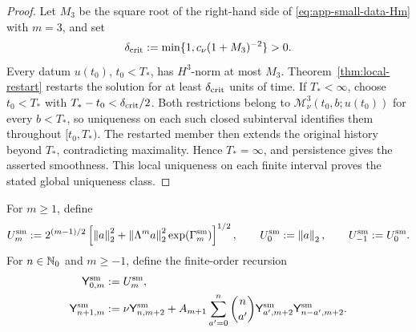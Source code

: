 \begin{proof}
Let \(M_3\) be the square root of the right-hand side of
\eqref{eq:app-small-data-Hm} with \(m=3\), and set
\[
 \delta_{\rm crit}
 :=\min\{1,c_\nu(1+M_3)^{-2}\}>0.
\]
Every datum \(u(t_0)\), \(t_0<T_*\), has \(H^3\)-norm at most \(M_3\).
Theorem~\ref{thm:local-restart} restarts the solution for at least
\(\delta_{\rm crit}\) units of time.  If \(T_*<\infty\), choose
\(t_0<T_*\) with \(T_*-t_0<\delta_{\rm crit}/2\).  Both restrictions belong
to \(\mathscr M_\nu^3(t_0,b;u(t_0))\) for every \(b<T_*\), so uniqueness on
each such closed subinterval identifies them throughout \([t_0,T_*)\).
The restarted member then extends the original history beyond \(T_*\),
contradicting maximality.  Hence \(T_*=\infty\), and persistence
 gives the asserted smoothness.  This local uniqueness on each finite
 interval proves the stated global uniqueness class.
\end{proof}

For \(m\ge1\), define
\[
 U_m^{\rm sm}
 :=
 2^{(m-1)/2}
 \left[
 \left\lVert a\right\rVert_2^2+
 \left\lVert \Lambda^ma\right\rVert_2^2\exp(\Gamma_m^{\rm sm})
 \right]^{1/2},
 \qquad
 U_0^{\rm sm}:=\left\lVert a\right\rVert_2,
 \qquad
 U_{-1}^{\rm sm}:=U_0^{\rm sm}.
\]
For \(n\in\mathbb N_0\) and \(m\ge-1\), define the finite-order recursion
\begin{align}
 \mathsf Y_{0,m}^{\rm sm}&:=U_m^{\rm sm},
 \label{eq:app-small-Y0}\\
 \mathsf Y_{n+1,m}^{\rm sm}
 &:=
 \nu\mathsf Y_{n,m+2}^{\rm sm}
 +A_{m+1}\sum_{a'=0}^{n}\binom n{a'}
 \mathsf Y_{a',m+2}^{\rm sm}
 \mathsf Y_{n-a',m+2}^{\rm sm}.
 \label{eq:app-small-Yrec}
\end{align}

